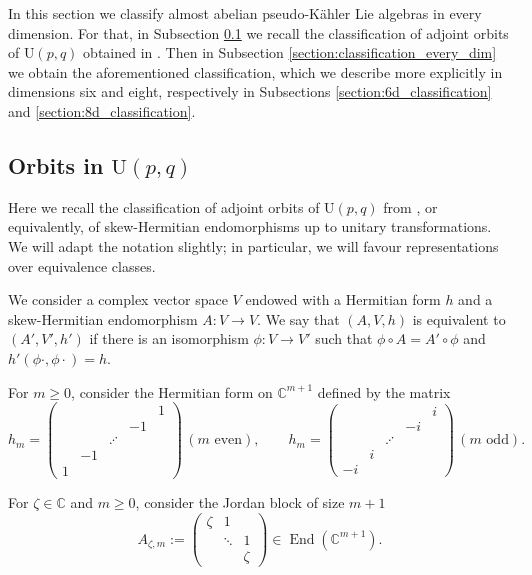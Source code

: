 \documentclass{article}
\theoremstyle{definition}
\DeclareMathOperator{\End}{End}
\newcommand{\C}{\mathbb{C}}
\begin{document}
In this section we classify almost abelian pseudo-Kähler Lie algebras in every dimension. For that, in Subsection \ref{section:orbits} we recall the classification of adjoint orbits of $\mathrm{U}(p,q)$ obtained in \cite{Burgoyne_Cushman_1977}. Then in Subsection \ref{section:classification_every_dim} we obtain the aforementioned classification, which we describe more explicitly in dimensions six and eight, respectively in Subsections \ref{section:6d_classification} and \ref{section:8d_classification}.

\subsection{Orbits in \texorpdfstring{$\mathrm{U}(p,q)$}{U(p,q)}}\label{section:orbits}

Here we recall the classification of adjoint orbits of $\mathrm{U}(p,q)$ from \cite{Burgoyne_Cushman_1977}, or equivalently, of skew-Hermitian endomorphisms up to unitary transformations. We will adapt the notation slightly; in particular, we will favour representations over equivalence classes.\medskip

We consider a complex vector space $V$ endowed with a Hermitian form $h$ and a skew-Hermitian endomorphism $A\colon V\to V$. We say that $(A,V,h)$ is equivalent to $(A',V',h')$ if there is an isomorphism $\phi\colon V\to V'$ such that $\phi\circ A=A'\circ\phi$ and $h'(\phi\cdot,\phi\cdot)=h$.\medskip

For $m\geq0$, consider the Hermitian form on $\C^{m+1}$ defined by the matrix $$h_m=\begin{pmatrix}
    &&&&1\\
    &&&-1&\\
    &&\iddots\\
    &-1\\
    1
\end{pmatrix}\,(m\text{ even}),\qquad h_m=\begin{pmatrix}
    &&&&i\\
    &&&-i&\\
    &&\iddots\\
    &i\\
    -i
\end{pmatrix}\,(m\text{ odd}).$$

For $\zeta\in\C$ and $m\geq0$, consider the Jordan block of size $m+1$ \begin{equation}\label{eqn:jordanblock}
    A_{\zeta,m}:=\begin{pmatrix}
        \zeta & 1 \\
        & \ddots & 1 \\
        & & \zeta
    \end{pmatrix}\in\End(\C^{m+1}).
\end{equation}
\end{document}
